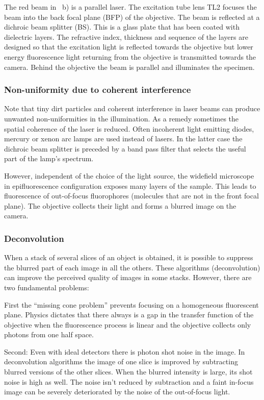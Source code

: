 
The red beam in ~b) is a parallel
laser. The excitation tube lens TL2 focuses the beam into the back
focal plane (BFP) of the objective. The beam is reflected at a
dichroic beam splitter (BS). This is a glass plate that has been
coated with dielectric layers. The refractive index, thickness and
sequence of the layers are designed so that the excitation light is
reflected towards the objective but lower energy fluorescence light
returning from the objective is transmitted towards the camera. Behind
the objective the beam is parallel and illuminates the specimen.
\subsubsection*{Non-uniformity due to coherent interference}
Note that tiny dirt particles and coherent interference in laser beams
can produce unwanted non-uniformities in the illumination. As a remedy
sometimes the spatial coherence of the laser is reduced. Often
incoherent light emitting diodes, mercury or xenon arc lamps are used
instead of lasers. In the latter case the dichroic beam splitter is
preceded by a band pass filter that selects the useful part of the
lamp's spectrum.

However, independent of the choice of the light source, the widefield
microscope in epifluorescence configuration exposes many layers of the
sample. This leads to fluorescence of out-of-focus fluorophores
(molecules that are not in the front focal plane). The objective
collects their light and forms a blurred image on the camera.
\subsubsection*{Deconvolution}
When a stack of several slices of an object is obtained, it is
possible to suppress the blurred part of each image in all the
others. These algorithms (deconvolution) can improve the perceived
quality of images in some stacks. However, there are two fundamental
problems:

First the ``missing cone problem'' prevents focusing on a homogeneous
fluorescent plane. Physics dictates that there always is a gap in the
transfer function of the objective when the fluorescence process is
linear and the objective collects only photons from one half space.

Second: Even with ideal detectors there is photon shot noise in the
image. In deconvolution algorithms the image of one slice is improved
by subtracting blurred versions of the other slices. When the blurred
intensity is large, its shot noise is high as well. The noise isn't
reduced by subtraction and a faint in-focus image can be severely
deteriorated by the noise of the out-of-focus light.
